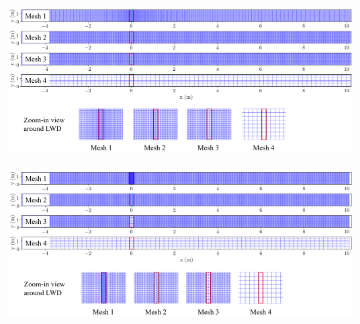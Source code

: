 \documentclass[preview, border=2pt]{standalone}
\begin{document}
\begin{figure}
     \centering
     \begin{subfigure}[b]{0.9\textwidth}
         \centering
         \caption{}
         \includegraphics[width=\textwidth]{SRH_meshes.png}
     \end{subfigure}
     \hfill     
     \begin{subfigure}[b]{0.9\textwidth}
         \centering
         \caption{}
         \includegraphics[width=\textwidth]{RAS_meshes.png}
     \end{subfigure}
\end{figure}
\end{document}
